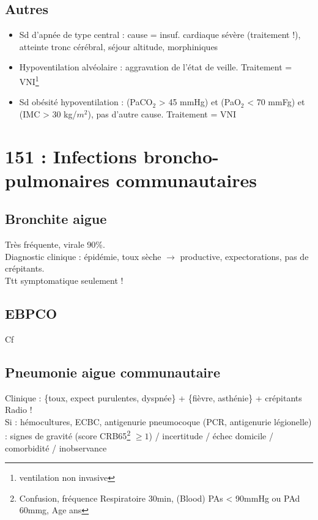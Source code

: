\documentclass{article}
\begin{document}
\subsection{Autres}
\begin{itemize}
\item Sd d'apnée de type central : cause = {insuf. cardiaque sévère (traitement !),
    atteinte tronc cérébral, séjour altitude, morphiniques}
\item Hypoventilation alvéolaire : aggravation de l'état de veille. Traitement =
  VNI\footnote{ventilation non invasive}
\item Sd obésité hypoventilation : (PaCO\(_{\text{2}}\) > 45 mmHg) et (PaO\(_{\text{2}}\) < 70 mmFg) et
  (IMC > 30 kg/\(m^2\)), pas d'autre cause. Traitement = VNI
\end{itemize}

\section{151 : Infections broncho-pulmonaires communautaires}
\subsection{Bronchite aigue}
Très fréquente, virale 90\%. \\
Diagnostic clinique : épidémie, toux sèche \(\to\) productive, expectorations,
pas de crépitants.\\
Ttt symptomatique seulement !

\subsection{EBPCO} Cf~

\subsection{Pneumonie aigue communautaire}
Clinique : \{toux, expect purulentes, dyspnée\} + \{fièvre, asthénie\} +
crépitants\\
Radio !\\
Si \faHospitalO : hémocultures, ECBC, antigenurie pneumocoque (\pm PCR,
antigenurie légionelle)\\
\faHospitalO : signes de gravité (score CRB65\footnote{Confusion, fréquence
  Respiratoire \ge 30min, (Blood) PAs < 90mmHg ou PAd \ge 60mmg, Age  ans}
\(\ge 1\)) / incertitude / échec domicile / comorbidité / inobservance
\end{document}

